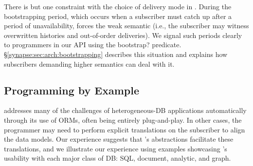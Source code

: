 There is but one constraint with the choice of delivery mode in
\synapse.  During the bootstrapping period, which occurs when a
subscriber must catch up after a period of unavailability, \synapse
forces the weak semantic (i.e., the subscriber may witness overwritten
histories and out-of-order deliveries).  We signal such periods
clearly to programmers in our API using the {\code bootstrap?}
predicate.  \S\ref{synapse:sec:arch:bootstrapping} describes this situation and
explains how subscribers demanding higher semantics can deal with it. 
\subsection{\synapse Programming by Example}
\label{synapse:sec:examples}

\synapse addresses many of the challenges of heterogeneous-DB applications automatically through its use of ORMs, often being entirely plug-and-play.
In other cases, the programmer may need to perform explicit translations on the subscriber to align the data models.
Our experience suggests that \synapse's abstractions facilitate these translations, and we illustrate our experience using examples showcasing \synapse's usability with each major class of DB: SQL, document, analytic, and graph.

